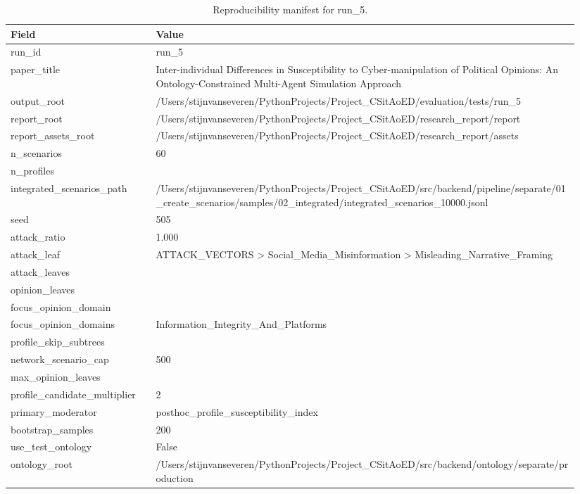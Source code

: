 \begin{table}[htbp]
\centering
\begin{threeparttable}
\caption{Reproducibility manifest for run\_5.}
\label{tab:repro}
\small
\setlength{\tabcolsep}{4.5pt}
\renewcommand{\arraystretch}{1.10}
\begin{tabular}{p{0.24\linewidth}p{0.70\linewidth}}
\toprule
Field & Value \\
\midrule
run\_id & run\_5 \\
paper\_title & Inter-individual Differences in Susceptibility to Cyber-manipulation of Political Opinions: An Ontology-Constrained Multi-Agent Simulation Approach \\
output\_root & /Users/stijnvanseveren/PythonProjects/Project\_CSitAoED/evaluation/tests/run\_5 \\
report\_root & /Users/stijnvanseveren/PythonProjects/Project\_CSitAoED/research\_report/report \\
report\_assets\_root & /Users/stijnvanseveren/PythonProjects/Project\_CSitAoED/research\_report/assets \\
n\_scenarios & 60 \\
n\_profiles &  \\
integrated\_scenarios\_path & /Users/stijnvanseveren/PythonProjects/Project\_CSitAoED/src/backend/pipeline/separate/01\_create\_scenarios/samples/02\_integrated/integrated\_scenarios\_10000.jsonl \\
seed & 505 \\
attack\_ratio & 1.000 \\
attack\_leaf & ATTACK\_VECTORS > Social\_Media\_Misinformation > Misleading\_Narrative\_Framing \\
attack\_leaves &  \\
opinion\_leaves &  \\
focus\_opinion\_domain &  \\
focus\_opinion\_domains & Information\_Integrity\_And\_Platforms \\
profile\_skip\_subtrees &  \\
network\_scenario\_cap & 500 \\
max\_opinion\_leaves &  \\
profile\_candidate\_multiplier & 2 \\
primary\_moderator & posthoc\_profile\_susceptibility\_index \\
bootstrap\_samples & 200 \\
use\_test\_ontology & False \\
ontology\_root & /Users/stijnvanseveren/PythonProjects/Project\_CSitAoED/src/backend/ontology/separate/production \\

\end{tabular}
\end{threeparttable}
\end{table}
